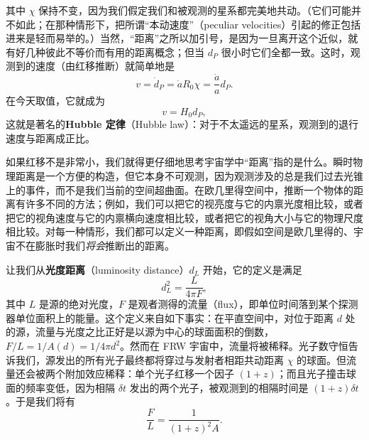 其中 $\chi$ 保持不变，因为我们假定我们和被观测的星系都完美地共动。（它们可能并不如此；在那种情形下，把所谓“本动速度”（peculiar velocities）引起的修正包括进来是轻而易举的。）当然，“距离”之所以加引号，是因为一旦离开这个近似，就有好几种彼此不等价而有用的距离概念；但当 $d_P$ 很小时它们全都一致。这时，观测到的速度（由红移推断）就简单地是
\begin{equation*}
v = \dot{d}_P = \dot{a}R_0\chi = \frac{\dot{a}}{a}d_P.
\tag{8.108}
\end{equation*}
在今天取值，它就成为
\begin{equation*}
\boxed{\,v = H_0 d_P,\,}
\tag{8.109}
\end{equation*}
这就是著名的\textbf{Hubble 定律}（Hubble law）：对于不太遥远的星系，观测到的退行速度与距离成正比。

如果红移不是非常小，我们就得更仔细地思考宇宙学中“距离”指的是什么。瞬时物理距离是一个方便的构造，但它本身不可观测，因为观测涉及的总是我们过去光锥上的事件，而不是我们当前的空间超曲面。在欧几里得空间中，推断一个物体的距离有许多不同的方法；例如，我们可以把它的视亮度与它的内禀光度相比较，或者把它的视角速度与它的内禀横向速度相比较，或者把它的视角大小与它的物理尺度相比较。对每一种情形，我们都可以定义一种距离，即假如空间是欧几里得的、宇宙不在膨胀时我们\emph{将会}推断出的距离。

让我们从\textbf{光度距离}（luminosity distance）$d_L$ 开始，它的定义是满足
\begin{equation*}
d_L^{2} = \frac{L}{4\pi F},
\tag{8.110}
\end{equation*}
其中 $L$ 是源的绝对光度，$F$ 是观者测得的流量（flux），即单位时间落到某个探测器单位面积上的能量。这个定义来自如下事实：在平直空间中，对位于距离 $d$ 处的源，流量与光度之比正好是以源为中心的球面面积的倒数，$F/L = 1/A(d) = 1/4\pi d^{2}$。然而在 FRW 宇宙中，流量将被稀释。光子数守恒告诉我们，源发出的所有光子最终都将穿过与发射者相距共动距离 $\chi$ 的球面。但流量还会被两个附加效应稀释：单个光子红移一个因子 $(1+z)$；而且光子撞击球面的频率变低，因为相隔 $\delta t$ 发出的两个光子，被观测到的相隔时间是 $(1+z)\delta t$。于是我们将有
\begin{equation*}
\frac{F}{L} = \frac{1}{(1+z)^{2}A}.
\tag{8.111}
\end{equation*}

